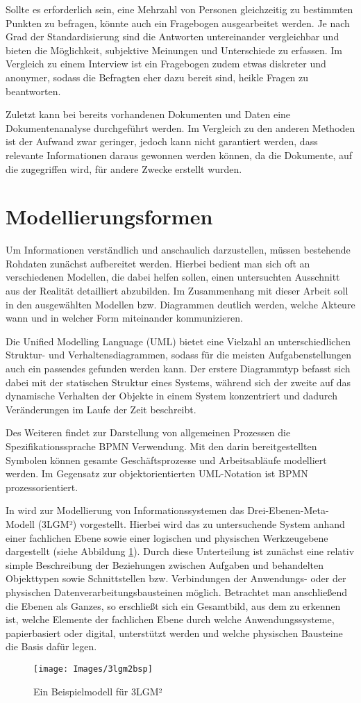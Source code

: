 Sollte es erforderlich sein, eine Mehrzahl von Personen gleichzeitig zu bestimmten Punkten zu befragen, könnte auch ein Fragebogen ausgearbeitet werden. Je nach Grad der Standardisierung sind die Antworten untereinander vergleichbar und bieten die Möglichkeit, subjektive Meinungen und Unterschiede zu erfassen. Im Vergleich zu einem Interview ist ein Fragebogen zudem etwas diskreter und anonymer, sodass die Befragten eher dazu bereit sind, heikle Fragen zu beantworten.

Zuletzt kann bei bereits vorhandenen Dokumenten und Daten eine Dokumentenanalyse durchgeführt werden. Im Vergleich zu den anderen Methoden ist der Aufwand zwar geringer, jedoch kann nicht garantiert werden, dass relevante Informationen daraus gewonnen werden können, da die Dokumente, auf die zugegriffen wird, für andere Zwecke erstellt wurden. \citep{Doering.2015}


\section{Modellierungsformen}

Um Informationen verständlich und anschaulich darzustellen, müssen bestehende Rohdaten zunächst aufbereitet werden. Hierbei bedient man sich oft an verschiedenen Modellen, die dabei helfen sollen, einen untersuchten Ausschnitt aus der Realität detailliert abzubilden. Im Zusammenhang mit dieser Arbeit soll in den ausgewählten Modellen bzw. Diagrammen deutlich werden, welche Akteure wann und in welcher Form miteinander kommunizieren.

Die Unified Modelling Language (UML) bietet eine Vielzahl an unterschiedlichen Struktur- und Verhaltensdiagrammen, sodass für die meisten Aufgabenstellungen auch ein passendes gefunden werden kann. Der erstere Diagrammtyp befasst sich dabei mit der statischen Struktur eines Systems, während sich der zweite auf das dynamische Verhalten der Objekte in einem System konzentriert und dadurch Veränderungen im Laufe der Zeit beschreibt. 

Des Weiteren findet zur Darstellung von allgemeinen Prozessen die Spezifikationssprache BPMN Verwendung. Mit den darin bereitgestellten Symbolen können gesamte Geschäftsprozesse und Arbeitsabläufe modelliert werden. Im Gegensatz zur objektorientierten UML-Notation ist BPMN prozessorientiert.

In \citet{Winter.2023} wird zur Modellierung von Informationssystemen das Drei-Ebenen-Meta-Modell (3LGM²) vorgestellt. Hierbei wird das zu untersuchende System anhand einer fachlichen Ebene sowie einer logischen und physischen Werkzeugebene dargestellt (siehe Abbildung \ref{fig:3lgm2bsp}). Durch diese Unterteilung ist zunächst eine relativ simple Beschreibung der Beziehungen zwischen Aufgaben und behandelten Objekttypen sowie Schnittstellen bzw. Verbindungen der Anwendungs- oder der physischen Datenverarbeitungsbausteinen möglich. Betrachtet man anschließend die Ebenen als Ganzes, so erschließt sich ein Gesamtbild, aus dem zu erkennen ist, welche Elemente der fachlichen Ebene durch welche Anwendungssysteme, papierbasiert oder digital, unterstützt werden und welche physischen Bausteine die Basis dafür legen.

\begin{figure}[h]
	\centering
	\texttt{[image: Images/3lgm2bsp]}
	\caption[Beispielmodell für 3LGM²]{Ein Beispielmodell für 3LGM²}
	\label{fig:3lgm2bsp}
\end{figure}
